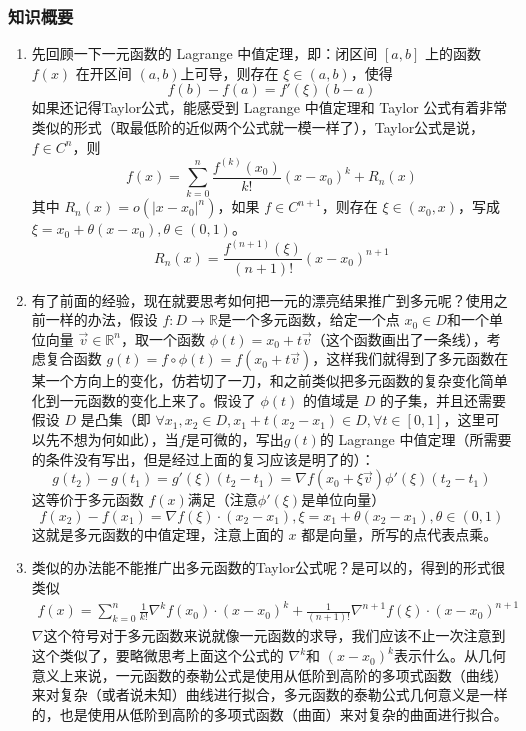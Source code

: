 \subsubsection{知识概要}
\begin{enumerate}
    \item 先回顾一下一元函数的 Lagrange 中值定理，即：闭区间 $[a, b]$ 上的函数 $f(x)$ 在开区间 $(a, b)$上可导，则存在 $\xi\in(a,b)$，使得
    $$
    f(b) - f(a) = f'(\xi)(b-a)
    $$
    如果还记得Taylor公式，能感受到 Lagrange 中值定理和 Taylor 公式有着非常类似的形式（取最低阶的近似两个公式就一模一样了），Taylor公式是说，$f \in C ^n$，则
    $$
    f(x)=\sum_{k=0}^n\frac{f^{(k)}(x_0)}{k!}(x-x_0)^k+R_n(x)
    $$
    其中 $R_n(x) =o(|x-x_0|^n) $，如果 $f \in C^{n+1}$，则存在 $\xi \in (x_0,x)$，写成 $\xi = x_0 + \theta(x-x_0), \theta \in (0,1)$。
    $$
    R_n(x)=\frac{f^{(n+1)}(\xi)}{(n+1)!}(x-x_0)^{n+1}
    $$

    \item 有了前面的经验，现在就要思考如何把一元的漂亮结果推广到多元呢？使用之前一样的办法，假设 $f:D \to \mathbb{R}$是一个多元函数，给定一个点 $x_0 \in D$和一个单位向量 $\vec{v} \in \mathbb{R}^n $，取一个函数 $\phi(t) = x_0 + t \vec{v}$（这个函数画出了一条线），考虑复合函数 $g(t) = f \circ \phi(t) = f(x_0 + t \vec{v}) $，这样我们就得到了多元函数在某一个方向上的变化，仿若切了一刀，和之前类似把多元函数的复杂变化简单化到一元函数的变化上来了。假设了 $\phi (t)$ 的值域是 $D$ 的子集，并且还需要假设 $D$ 是凸集（即 $\forall x_1, x_2 \in D, x_1+t(x_2-x_1)\in D,\forall t\in[0,1]$，这里可以先不想为何如此），当$f$是可微的，写出$g (t)$的 Lagrange 中值定理（所需要的条件没有写出，但是经过上面的复习应该是明了的）：
    $$
    g(t_2) - g(t_1) = g'(\xi) (t_2 - t_1) = \nabla f(x_0 + \xi \vec{v}) \phi'(\xi)(t_2 -t_1) 
    $$
    这等价于多元函数 $f(x)$满足（注意$\phi'(\xi)$是单位向量）
    $$
    f(x_2)-f(x_1)=\nabla f(\xi)\cdot(x_2-x_1), \xi=x_1+\theta(x_2-x_1),\theta\in(0,1)
    $$
    这就是多元函数的中值定理，注意上面的 $x$ 都是向量，所写的点代表点乘。

    \item 类似的办法能不能推广出多元函数的Taylor公式呢？是可以的，得到的形式很类似
    $$
    \begin{aligned}
    f(x)=\sum_{k=0}^n\frac{1}{k!}\nabla ^k f(x_0)\cdot(x-x_0)^k+\frac{1}{(n+1)!}\nabla^{n+1}f(\xi)\cdot(x-x_0)^{n+1}
    \end{aligned}
    $$
    $\nabla$这个符号对于多元函数来说就像一元函数的求导，我们应该不止一次注意到这个类似了，要略微思考上面这个公式的 $\nabla ^k$和 $(x-x_0)^k$表示什么。从几何意义上来说，一元函数的泰勒公式是使用从低阶到高阶的多项式函数（曲线）来对复杂（或者说未知）曲线进行拟合，多元函数的泰勒公式几何意义是一样的，也是使用从低阶到高阶的多项式函数（曲面）来对复杂的曲面进行拟合。
\end{enumerate}

\newpage